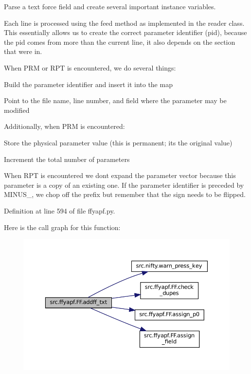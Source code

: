 Parse a text force field and create several important instance variables. 

Each line is processed using the \textquotesingle{}feed\textquotesingle{} method as implemented in the reader class. This essentially allows us to create the correct parameter identifier (pid), because the pid comes from more than the current line, it also depends on the section that we\textquotesingle{}re in.

When \textquotesingle{}P\+RM\textquotesingle{} or \textquotesingle{}R\+PT\textquotesingle{} is encountered, we do several things\+:
\begin{DoxyItemize}
\item Build the parameter identifier and insert it into the map
\item Point to the file name, line number, and field where the parameter may be modified
\end{DoxyItemize}

Additionally, when \textquotesingle{}P\+RM\textquotesingle{} is encountered\+:
\begin{DoxyItemize}
\item Store the physical parameter value (this is permanent; it\textquotesingle{}s the original value)
\item Increment the total number of parameters
\end{DoxyItemize}

When \textquotesingle{}R\+PT\textquotesingle{} is encountered we don\textquotesingle{}t expand the parameter vector because this parameter is a copy of an existing one. If the parameter identifier is preceded by M\+I\+N\+U\+S\+\_\+, we chop off the prefix but remember that the sign needs to be flipped. 

Definition at line 594 of file ffyapf.\+py.

Here is the call graph for this function\+:
\nopagebreak
\begin{figure}[H]
\begin{center}
\leavevmode
\includegraphics[width=350pt]{classsrc_1_1ffyapf_1_1FF_ac25a6ff72cab072dadff7b9538e5d5b2_cgraph}
\end{center}
\end{figure}
\mbox{\label{classsrc_1_1ffyapf_1_1FF_af943ddc128da40ca3007e78ac2cadfd9}} 
